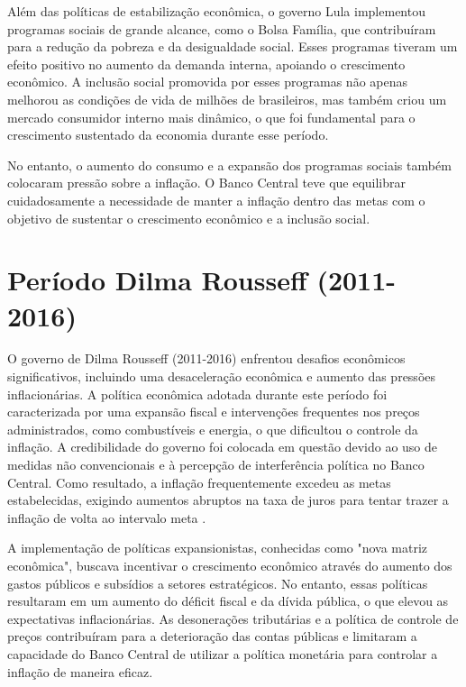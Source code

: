 \documentclass[12pt,oneside,a4paper,chapter=TITLE,english,brazil,sumario=abnt-6027-2012]{abntex2}
\begin{document}
Além das políticas de estabilização econômica, o governo Lula implementou programas sociais de grande alcance, como o Bolsa Família, que contribuíram para a redução da pobreza e da desigualdade social. Esses programas tiveram um efeito positivo no aumento da demanda interna, apoiando o crescimento econômico. A inclusão social promovida por esses programas não apenas melhorou as condições de vida de milhões de brasileiros, mas também criou um mercado consumidor interno mais dinâmico, o que foi fundamental para o crescimento sustentado da economia durante esse período.

No entanto, o aumento do consumo e a expansão dos programas sociais também colocaram pressão sobre a inflação. O Banco Central teve que equilibrar cuidadosamente a necessidade de manter a inflação dentro das metas com o objetivo de sustentar o crescimento econômico e a inclusão social.


\section{Período Dilma Rousseff (2011-2016)}
O governo de Dilma Rousseff (2011-2016) enfrentou desafios econômicos significativos, incluindo uma desaceleração econômica e aumento das pressões inflacionárias. A política econômica adotada durante este período foi caracterizada por uma expansão fiscal e intervenções frequentes nos preços administrados, como combustíveis e energia, o que dificultou o controle da inflação. A credibilidade do governo foi colocada em questão devido ao uso de medidas não convencionais e à percepção de interferência política no Banco Central. Como resultado, a inflação frequentemente excedeu as metas estabelecidas, exigindo aumentos abruptos na taxa de juros para tentar trazer a inflação de volta ao intervalo meta \cite{carvalho_2016_growth}.

A implementação de políticas expansionistas, conhecidas como "nova matriz econômica", buscava incentivar o crescimento econômico através do aumento dos gastos públicos e subsídios a setores estratégicos. No entanto, essas políticas resultaram em um aumento do déficit fiscal e da dívida pública, o que elevou as expectativas inflacionárias. As desonerações tributárias e a política de controle de preços contribuíram para a deterioração das contas públicas e limitaram a capacidade do Banco Central de utilizar a política monetária para controlar a inflação de maneira eficaz.
\end{document}
